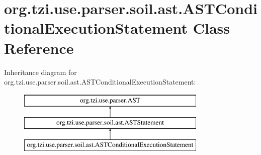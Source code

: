 \hypertarget{classorg_1_1tzi_1_1use_1_1parser_1_1soil_1_1ast_1_1_a_s_t_conditional_execution_statement}{\section{org.\-tzi.\-use.\-parser.\-soil.\-ast.\-A\-S\-T\-Conditional\-Execution\-Statement Class Reference}
\label{classorg_1_1tzi_1_1use_1_1parser_1_1soil_1_1ast_1_1_a_s_t_conditional_execution_statement}
}
Inheritance diagram for org.\-tzi.\-use.\-parser.\-soil.\-ast.\-A\-S\-T\-Conditional\-Execution\-Statement\-:\begin{figure}[H]
\begin{center}
\leavevmode
\includegraphics[height=3.000000cm]{classorg_1_1tzi_1_1use_1_1parser_1_1soil_1_1ast_1_1_a_s_t_conditional_execution_statement}
\end{center}
\end{figure}
